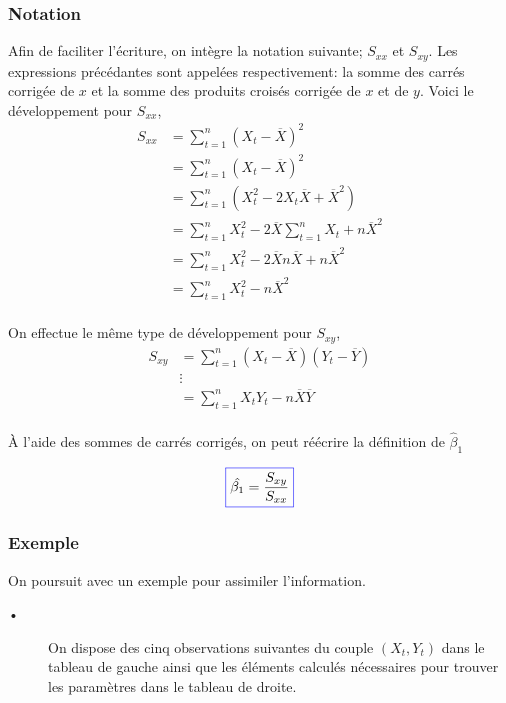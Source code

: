 \documentclass[11pt,french]{report}
\begin{document}
\subsubsection{Notation}
Afin de faciliter l'écriture, on intègre la notation suivante; $S_{xx}$ et  $S_{xy}$. Les expressions précédantes sont appelées respectivement: la somme des carrés corrigée de $x$ et la somme des produits croisés corrigée de $x$ et de $y$.
Voici le développement pour $S_{xx}$,
\begin{align*}
S_{xx} &= \displaystyle\sum_{t=1}^n (X_t - \overline{X})^2 \\
&= \displaystyle\sum_{t=1}^n (X_t - \overline{X})^2 \\
&= \displaystyle\sum_{t=1}^n (X_t^2 - 2X_t\overline{X} + \overline{X}^2) \\
&= \displaystyle\sum_{t=1}^n X_t^2 - 2\overline{X}\displaystyle\sum_{t=1}^n X_t + n\overline{X}^2 \\
&= \displaystyle\sum_{t=1}^n X_t^2 - 2\overline{X}n\overline{X} + n\overline{X}^2 \\
&= \displaystyle\sum_{t=1}^n X_t^2 - n\overline{X}^2 \\
\end{align*}

On effectue le même type de développement pour $S_{xy}$, 
\begin{align*}
S_{xy} &= \displaystyle\sum_{t=1}^n (X_t - \overline{X}) (Y_t - \overline{Y}) \\
&\vdots \\
&= \displaystyle\sum_{t=1}^n X_tY_t - n\overline{X}\overline{Y}\\
\end{align*}

À l'aide des sommes de carrés corrigés, on peut réécrire la définition de $\hat{\beta}_1$

\begin{equation}
\label{eq:beta1SXY}
\color{blue}
\boxed{\color{black}
\hat{\beta_1} = \frac{S_{xy}}{S_{xx}}
}
\end{equation}

\bigskip
\subsubsection{Exemple}
\label{exemple1}
On poursuit avec un exemple pour assimiler l'information.

\bigskip
\begin{description}
\item[•] On dispose des cinq observations suivantes du couple $(X_t, Y_t)$ dans le tableau de gauche ainsi que les éléments calculés nécessaires pour trouver les paramètres dans le tableau de droite.
\end{description}
\end{document}
